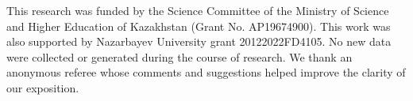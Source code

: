 \documentclass[a4paper,12pt,reqno]{amsart}
\numberwithin{equation}{section}
\theoremstyle{plain}
\theoremstyle{definition}
\begin{document}
This research was funded by the Science Committee of the Ministry of Science and Higher Education of Kazakhstan (Grant No. AP19674900). This work was also supported by Nazarbayev University grant 20122022FD4105. No new data were collected or generated during the course of research. We thank an anonymous referee whose comments and suggestions helped improve the clarity of our exposition.



\end{document}
